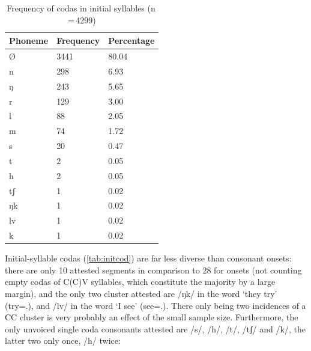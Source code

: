 \begin{table}[pth]\centering
\caption[Frequency of codas in initial syllables]{Frequency of codas in initial 
syllables (n\,=\,4299)}
\begin{tabu} to 0.67\linewidth{X X[c] X[c]}
\tableheaderfont\toprule
Phoneme
	& Frequency
	& Percentage
	\\
	
\toprule

Ø
	& 3441
	& 80.04\pct
	\\

\midrule

n
	& 298
	& 6.93\pct
	\\

ŋ
	& 243
	& 5.65\pct
	\\

r
	& 129
	& 3.00\pct
	\\

l
	& 88
	& 2.05\pct
	\\

m
	& 74
	& 1.72\pct
	\\

s
	& 20
	& 0.47\pct
	\\

t
	& 2
	& 0.05\pct
	\\

h
	& 2
	& 0.05\pct
	\\
	
tʃ
	& 1
	& 0.02\pct
	\\

ŋk
	& 1
	& 0.02\pct
	\\

lv
	& 1
	& 0.02\pct
	\\

k
	& 1
	& 0.02\pct
	\\

\bottomrule
\end{tabu}
\label{tab:initcod}
\end{table}

Initial-syllable codas (\autoref{tab:initcod}) are far less diverse than 
consonant onsets: there are only 10 attested segments in comparison to 28 for 
onsets (not counting empty codas of C(C)V syllables, which constitute the 
majority by a large margin), and the only two cluster attested are /ŋk/ in the 
word  `they try' (try=\TplM{}.\Aarg{}), and /lv/ in the 
word  `I see' (see=\Fpl{}.\Aarg{}). There only being 
two incidences of a CC cluster is very probably an effect of the small 
sample size. Furthermore, the only unvoiced single coda consonants attested are 
/s/, /h/, /t/, /tʃ/ and /k/, the latter two only once, /h/ twice:

